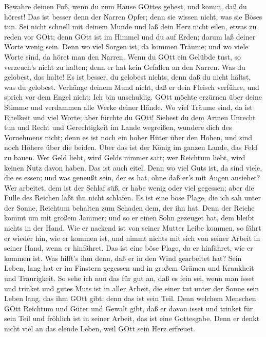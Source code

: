  Bewahre deinen Fuß, wenn du zum Hause GOttes gehest, und
komm, daß du hörest! Das ist besser denn der Narren Opfer; denn sie
wissen nicht, was sie Böses tun.  Sei nicht schnell mit
deinem Munde und laß dein Herz nicht eilen, etwas zu reden vor GOtt;
denn GOtt ist im Himmel und du auf Erden; darum laß deiner Worte wenig
sein.  Denn wo viel Sorgen ist, da kommen Träume; und wo
viele Worte sind, da höret man den Narren.  Wenn du GOtt ein
Gelübde tust, so verzeuch's nicht zu halten; denn er hat kein Gefallen
an den Narren. Was du gelobest, das halte!  Es ist besser,
du gelobest nichts, denn daß du nicht hältst, was du gelobest.
 Verhänge deinem Mund nicht, daß er dein Fleisch verführe,
und sprich vor dem Engel nicht: Ich bin unschuldig. GOtt möchte erzürnen
über deine Stimme und verdammen alle Werke deiner Hände.  Wo
viel Träume sind, da ist Eitelkeit und viel Worte; aber fürchte du GOtt!
 Siehest du dem Armen Unrecht tun und Recht und
Gerechtigkeit im Lande wegreißen, wundere dich des Vornehmens nicht;
denn es ist noch ein hoher Hüter über den Hohen, und sind noch Höhere
über die beiden.  Über das ist der König im ganzen Lande,
das Feld zu bauen.  Wer Geld liebt, wird Gelds nimmer satt;
wer Reichtum liebt, wird keinen Nutz davon haben. Das ist auch eitel.
 Denn wo viel Guts ist, da sind viele, die es essen; und
was geneußt sein, der es hat, ohne daß er's mit Augen ansiehet?
 Wer arbeitet, dem ist der Schlaf süß, er habe wenig oder
viel gegessen; aber die Fülle des Reichen läßt ihn nicht schlafen.
 Es ist eine böse Plage, die ich sah unter der Sonne,
Reichtum behalten zum Schaden dem, der ihn hat.  Denn der
Reiche kommt um mit großem Jammer; und so er einen Sohn gezeuget hat,
dem bleibt nichts in der Hand.  Wie er nackend ist von
seiner Mutter Leibe kommen, so fährt er wieder hin, wie er kommen ist,
und nimmt nichts mit sich von seiner Arbeit in seiner Hand, wenn er
hinfähret.  Das ist eine böse Plage, da er hinfähret, wie
er kommen ist. Was hilft's ihm denn, daß er in den Wind gearbeitet hat?
 Sein Leben, lang hat er im Finstern gegessen und in großem
Grämen und Krankheit und Traurigkeit.  So sehe ich nun das
für gut an, daß es fein sei, wenn man isset und trinket und gutes Muts
ist in aller Arbeit, die einer tut unter der Sonne sein Leben lang, das
ihm GOtt gibt; denn das ist sein Teil.  Denn welchem
Menschen GOtt Reichtum und Güter und Gewalt gibt, daß er davon isset und
trinket für sein Teil und fröhlich ist in seiner Arbeit, das ist eine
Gottesgabe.  Denn er denkt nicht viel an das elende Leben,
weil GOtt sein Herz erfreuet.

